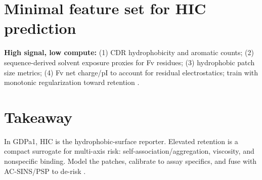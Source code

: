 \documentclass[11pt]{article}
\begin{document}
\section{Minimal feature set for HIC prediction}
\textbf{High signal, low compute:}
(1) CDR hydrophobicity and aromatic counts; (2) sequence-derived solvent exposure proxies for Fv residues; (3) hydrophobic patch size metrics; (4) Fv net charge/pI to account for residual electrostatics; train with monotonic regularization toward retention \citep{Jain2017Bioinf,Waibl2022,Karlberg2020,Ewonde2024}.

\section{Takeaway}
In GDPa1, HIC is the hydrophobic-surface reporter. Elevated retention is a compact surrogate for multi-axis risk: self-association/aggregation, viscosity, and nonspecific binding. Model the patches, calibrate to assay specifics, and fuse with AC-SINS/PSP to de-risk \citep{GDPa1Rules2025,GDPa1HF,Estep2015,Bailly2020,Hebditch2019,Armstrong2024}.
\end{document}
